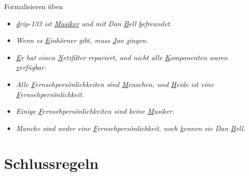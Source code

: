 \begin{frame}
  {Formalisieren üben}
  \onslide<+->
  \begin{itemize}[<+->]
    \item \textit{\underline{d}rip-133 ist \underline{Musiker} und mit Dan \underline{B}ell \underline{b}efreundet.}
    \item \textit{Wenn es \underline{E}inhörner gibt, muss \underline{J}an \underline{s}ingen.}
    \item \textit{\underline{E}r hat einen \underline{N}etzfilter repariert, und nicht alle \underline{K}omponenten waren \underline{v}erfügbar.}
    \item \textit{Alle \underline{F}ernsehpersönlichkeiten sind \underline{M}enschen, und \underline{H}eide ist eine \underline{F}ernsehpersönlichkeit.}
    \item \textit{Einige \underline{F}ernsehpersönlichkeiten sind keine \underline{M}usiker.}
    \item \textit{Manche sind weder eine \underline{F}ernsehpersönlichkeit, noch \underline{k}ennen sie Dan \underline{B}ell.}
  \end{itemize}
\end{frame}

\section{Schlussregeln}

